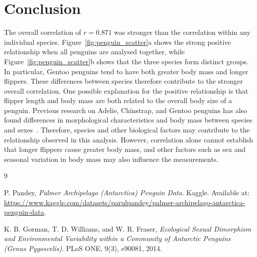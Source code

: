 \documentclass{article}
\begin{document}
\section*{Conclusion}
The overall correlation of $r=0.871$ was stronger than the correlation within any individual species. Figure~\ref{fig:penguin_scatter}a shows the strong positive relationship when all penguins are analysed together, while Figure~\ref{fig:penguin_scatter}b shows that the three species form distinct groups. In particular, Gentoo penguins tend to have both greater body mass and longer flippers. These differences between species therefore contribute to the stronger overall correlation. One possible explanation for the positive relationship is that flipper length and body mass are both related to the overall body size of a penguin. Previous research on Adelie, Chinstrap, and Gentoo penguins has also found differences in morphological characteristics and body mass between species and sexes~\cite{gorman2014}. Therefore, species and other biological factors may contribute to the relationship observed in this analysis. However, correlation alone cannot establish that longer flippers cause greater body mass, and other factors such as sex and seasonal variation in body mass may also influence the measurements.

\begin{thebibliography}{9}

P. Pandey,
\textit{Palmer Archipelago (Antarctica) Penguin Data}.
Kaggle.
Available at:
\href{https://www.kaggle.com/datasets/parulpandey/palmer-archipelago-antarctica-penguin-data}
{https://www.kaggle.com/datasets/parulpandey/palmer-archipelago-antarctica-penguin-data}.

K. B. Gorman, T. D. Williams, and W. R. Fraser,
\textit{Ecological Sexual Dimorphism and Environmental Variability within a Community of Antarctic Penguins (Genus Pygoscelis)}.
PLoS ONE, 9(3), e90081, 2014.


\end{thebibliography}
\end{document}
